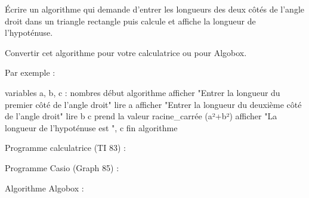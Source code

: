 
%
Écrire un algorithme qui demande d'entrer les longueurs des deux côtés de l'angle droit dans un triangle rectangle puis calcule et affiche la longueur de l'hypoténuse.
\par
Convertir cet algorithme pour votre calculatrice ou pour Algobox.
\begin{corrige}
     Par exemple :
\begin{code}
variables
   a, b, c : nombres
début algorithme
   afficher "Entrer la longueur du premier côté de l'angle droit"
   lire a
   afficher "Entrer la longueur du deuxième côté de l'angle droit"
   lire b
   c prend la valeur racine_carrée (a²+b²)
   afficher "La longueur de l'hypoténuse est ", c
fin algorithme
\end{code}
     Programme calculatrice (TI 83) :
\begin{center}
\end{center}
     Programme Casio (Graph 85) :
\begin{center}
\end{center}
     Algorithme Algobox :
\begin{center}
\end{center}

\end{corrige}
